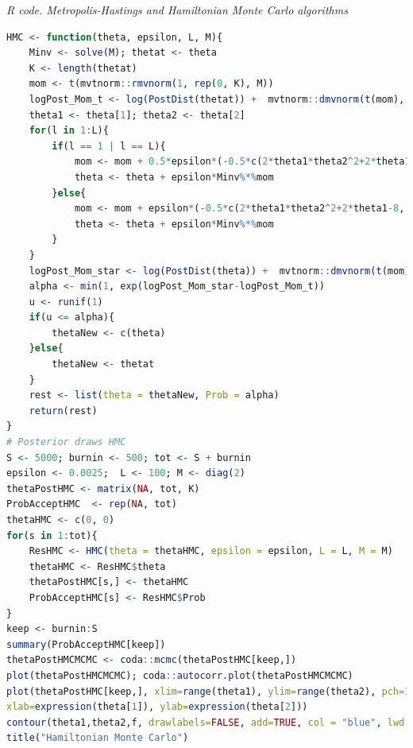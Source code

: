 \begin{enumerate}[leftmargin=*]
 \begin{tcolorbox}[enhanced,width=4.67in,center upper,
	fontupper=\large\bfseries,drop shadow southwest,sharp corners]
	\textit{R code. Metropolis-Hastings and Hamiltonian Monte Carlo algorithms}
	\begin{VF}
		\begin{lstlisting}[language=R]
HMC <- function(theta, epsilon, L, M){
	Minv <- solve(M); thetat <- theta
	K <- length(thetat)
	mom <- t(mvtnorm::rmvnorm(1, rep(0, K), M))
	logPost_Mom_t <- log(PostDist(thetat)) +  mvtnorm::dmvnorm(t(mom), rep(0, K), M, log = TRUE)  
	theta1 <- theta[1]; theta2 <- theta[2] 
	for(l in 1:L){
		if(l == 1 | l == L){
			mom <- mom + 0.5*epsilon*(-0.5*c(2*theta1*theta2^2+2*theta1-8, 2*theta2*theta1^2+2*theta2-8))
			theta <- theta + epsilon*Minv%*%mom
		}else{
			mom <- mom + epsilon*(-0.5*c(2*theta1*theta2^2+2*theta1-8, 2*theta2*theta1^2+2*theta2-8))
			theta <- theta + epsilon*Minv%*%mom
		}
	}
	logPost_Mom_star <- log(PostDist(theta)) +  mvtnorm::dmvnorm(t(mom), rep(0, K), M, log = TRUE)  
	alpha <- min(1, exp(logPost_Mom_star-logPost_Mom_t))
	u <- runif(1)
	if(u <= alpha){
		thetaNew <- c(theta)
	}else{
		thetaNew <- thetat
	}
	rest <- list(theta = thetaNew, Prob = alpha)
	return(rest)
}
# Posterior draws HMC
S <- 5000; burnin <- 500; tot <- S + burnin
epsilon <- 0.0025;  L <- 100; M <- diag(2)
thetaPostHMC <- matrix(NA, tot, K)
ProbAcceptHMC  <- rep(NA, tot)
thetaHMC <- c(0, 0)
for(s in 1:tot){
	ResHMC <- HMC(theta = thetaHMC, epsilon = epsilon, L = L, M = M)
	thetaHMC <- ResHMC$theta
	thetaPostHMC[s,] <- thetaHMC
	ProbAcceptHMC[s] <- ResHMC$Prob
}
keep <- burnin:S
summary(ProbAcceptHMC[keep])
thetaPostHMCMCMC <- coda::mcmc(thetaPostHMC[keep,])
plot(thetaPostHMCMCMC); coda::autocorr.plot(thetaPostHMCMCMC)
plot(thetaPostHMC[keep,], xlim=range(theta1), ylim=range(theta2), pch=16, col=grey(0.8),
xlab=expression(theta[1]), ylab=expression(theta[2]))
contour(theta1,theta2,f, drawlabels=FALSE, add=TRUE, col = "blue", lwd = 1.2)
title("Hamiltonian Monte Carlo")
\end{lstlisting}
	\end{VF}
\end{tcolorbox} 


\end{enumerate}
